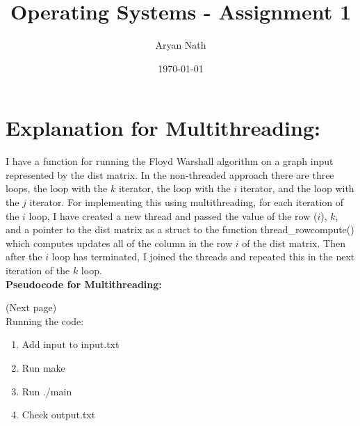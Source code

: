 \documentclass[11pt]{article}
\title{ Operating Systems - Assignment 1}
\author{ Aryan Nath }
\date{\today}
\begin{document}
\maketitle	


\section{Explanation for Multithreading:}
I have a function for running the Floyd Warshall algorithm on a graph input represented by the dist matrix. In the non-threaded approach there are three loops, the loop with the $k$ iterator, the loop with the $i$ iterator, and the loop with the $j$ iterator. For implementing this using multithreading, for each iteration of the $i$ loop, I have created a new thread and passed the value of the row ($i$), $k$, and a pointer to the dist matrix as a struct to the function thread\_rowcompute() which computes updates all of the column in the row $i$ of the dist matrix. Then after the $i$ loop has terminated, I joined the threads and repeated this in the next iteration of the $k$ loop.\\

\noindent \textbf{Pseudocode for Multithreading:}

\noindent (Next page)\\

\noindent Running the code:
\begin{enumerate}
\item Add input to input.txt
\item Run make
\item Run ./main
\item Check output.txt
\end{enumerate}
\end{document}
